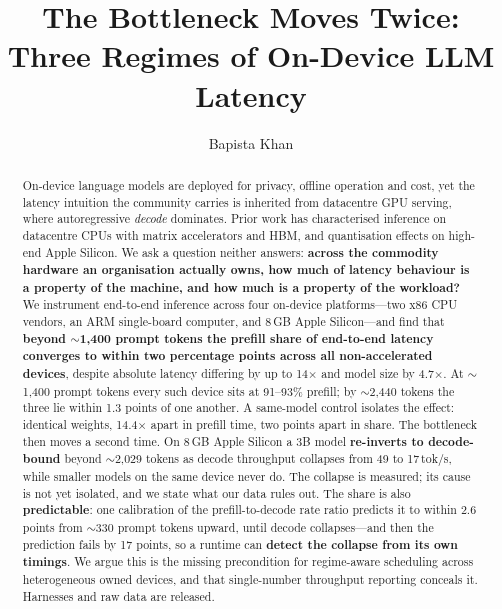 \documentclass[sigconf,nonacm,10pt]{acmart}
\begin{document}
\title{The Bottleneck Moves Twice: Three Regimes of
On-Device LLM Latency}

\author{Bapista Khan}
\renewcommand{\shortauthors}{Bapista Khan}

\begin{abstract}
On-device language models are deployed for privacy, offline operation and cost, yet the latency intuition the
community carries is inherited from datacentre GPU serving, where autoregressive \emph{decode} dominates. Prior
work has characterised inference on datacentre CPUs with matrix accelerators and HBM, and quantisation effects
on high-end Apple Silicon. We ask a question neither answers: \textbf{across the commodity hardware an
organisation actually owns, how much of latency behaviour is a property of the machine, and how much is a
property of the workload?}
We instrument end-to-end inference across four on-device platforms---two x86 CPU vendors, an ARM single-board
computer, and 8\,GB Apple Silicon---and find that \textbf{beyond $\sim$1{,}400 prompt tokens the prefill share of
end-to-end latency converges to within two percentage points across all non-accelerated devices}, despite absolute
latency differing by up to 14$\times$ and model size by 4.7$\times$. At $\sim$1{,}400 prompt tokens every such
device sits at 91--93\% prefill; by $\sim$2{,}440 tokens the three lie within 1.3 points of one another. A same-model control isolates the effect:
identical weights, 14.4$\times$ apart in prefill time, two points apart in share.
The bottleneck then moves a second time. On 8\,GB Apple Silicon a 3B model \textbf{re-inverts to decode-bound}
beyond $\sim$2{,}029 tokens as decode throughput collapses from 49 to 17\,tok/s, while smaller models on the same
device never do. The collapse is measured; its cause is not yet isolated, and we state what our data rules out.
The share is also \textbf{predictable}: one calibration of the prefill-to-decode rate ratio predicts it to
within 2.6 points from $\sim$330 prompt tokens upward, until decode collapses---and then the prediction fails by
17 points, so a runtime can \textbf{detect the collapse from its own timings}. We argue this is the missing
precondition for regime-aware scheduling across heterogeneous owned devices, and that single-number
throughput reporting conceals it. Harnesses and raw data are released.
\end{abstract}

\end{document}

